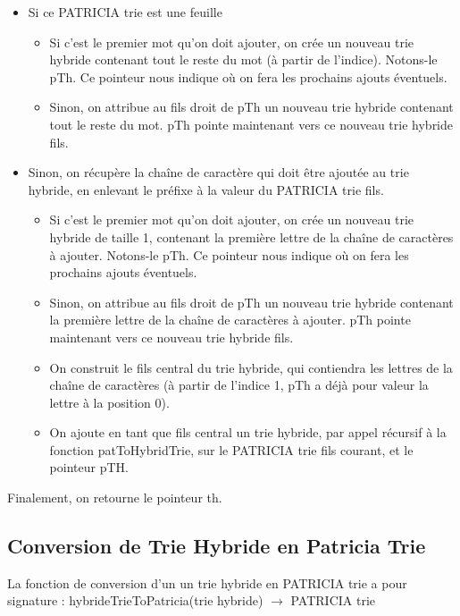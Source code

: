 \documentclass[a4paper,12pt]{report}
\begin{document}
\begin{itemize}
\item Si ce PATRICIA trie est une feuille
	\begin{itemize}
	\item Si c'est le premier mot qu'on doit ajouter, on crée un nouveau trie hybride contenant tout le reste du mot (à partir de l'indice). Notons-le pTh. Ce pointeur nous indique où on fera les prochains ajouts éventuels. 
	\item Sinon, on attribue au fils droit de pTh un nouveau trie hybride contenant tout le reste du mot. pTh pointe maintenant vers ce nouveau trie hybride fils.
	\end{itemize}

	\item Sinon, on récupère la chaîne de caractère qui doit être ajoutée au trie hybride, en enlevant le préfixe à la valeur du PATRICIA trie fils.

	\begin{itemize}
	\item Si c'est le premier mot qu'on doit ajouter, on crée un nouveau trie hybride de taille 1, contenant la première lettre de la chaîne de caractères à ajouter. Notons-le pTh. Ce pointeur nous indique où on fera les prochains ajouts éventuels. 
	
	\item Sinon, on attribue au fils droit de pTh un nouveau trie hybride contenant la première lettre de la chaîne de caractères à ajouter. pTh pointe maintenant vers ce nouveau trie hybride fils.
		
	\item On construit le fils central du trie hybride, qui contiendra les lettres de la chaîne de caractères (à partir de l'indice 1, pTh a déjà pour valeur la lettre à la position 0).
	
	\item  On ajoute en tant que fils central un trie hybride, par appel récursif à la fonction patToHybridTrie, sur le PATRICIA trie fils courant, et le pointeur pTH.
	
	\end{itemize}	

		
	
\end{itemize}

Finalement, on retourne le pointeur th.


\subsection{Conversion de Trie Hybride en Patricia Trie}
La fonction de conversion d'un un trie hybride en PATRICIA trie a pour signature : hybrideTrieToPatricia(trie hybride) $\rightarrow$ PATRICIA trie
\end{document}
